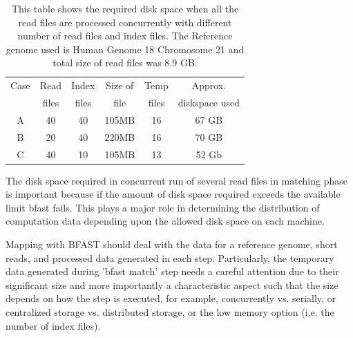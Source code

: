 \documentclass{acm_proc_article-sp}
\begin{document}
\begin{table}
 \begin{tabular}{|c|c|c|c|c|c|} 
 \hline 
Case &Read& Index& Size of &  Temp & Approx.  \\
 &files &  files  &  file& files &  diskspace used\\
 \hline
A&40 & 40 &105MB & 16 &67 GB \\
B&20 & 40 & 220MB & 16 &70 GB \\
C&40 & 10 & 105MB & 13 &52 Gb \\ 
 \hline
 \end{tabular}
 \label{table:dynamic-diskspace} 
 \caption{This table shows the required disk space when all the read files are processed concurrently 
 with different number of read files and index files. The Reference genome used is Human Genome 
 18 Chromosome 21 and total size of read files was 8.9 GB. }
\end{table}

The disk space required in concurrent run of several read files in matching phase is important because
 if the amount of disk space required exceeds the available limit bfast fails. This plays a 
 major role in determining the distribution of computation data depending upon the allowed disk space on each machine. 


Mapping with BFAST should deal with the data for a reference genome, short reads, and processed 
data generated in each step.  Particularly, the temporary data generated during 'bfast match' step 
needs a careful attention due to their significant size and more importantly a characteristic aspect
 such that the size depends on how the step is executed, for example, concurrently vs. serially, 
 or centralized storage vs. distributed storage, or the low memory option (i.e. the number of index files).
   
\end{document}
